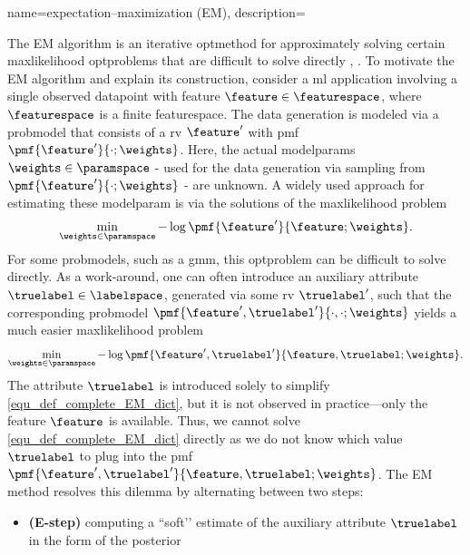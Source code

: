 {name={expectation–maximization (EM)}, 
	description={
	    The EM \gls{algorithm} is an iterative \gls{optmethod} for 
		approximately solving certain \gls{maxlikelihood} \glspl{optproblem} 
		that are difficult to solve directly \cite[Sec. 9.4]{BishopBook}, \cite[Sec. 11.4.7]{Murphy2012}.
	    To motivate the EM \gls{algorithm} and explain its construction, 
		consider a \gls{ml} application involving a single observed \gls{datapoint} 
		with \gls{feature} $\feature \in \featurespace$, where $\featurespace$ 
		is a finite \gls{featurespace}. The \gls{data} generation 
		is modeled via a \gls{probmodel} that consists of a \gls{rv} $\feature'$ 
		with \gls{pmf} $\pmf{\feature'}{\cdot;\weights}$. Here, 
		the actual \glspl{modelparam} $\weights \in \paramspace$ - used for the \gls{data} 
		generation via sampling from $\pmf{\feature'}{\cdot;\weights}$ - are unknown. A widely 
		used approach for estimating these \gls{modelparam} is via the solutions of the \gls{maxlikelihood} 
		problem
		\begin{equation}
			\label{equ_def_ML_EM_dict}
			\min_{\weights \in \paramspace} - \log \pmf{\feature'}{\feature;\weights}.
		\end{equation}
		For some \glspl{probmodel}, such as a \gls{gmm}, this \gls{optproblem} can be 
		difficult to solve directly. As a work-around, one can often introduce an auxiliary 
		attribute $\truelabel \in \labelspace$, generated via some \gls{rv} $\truelabel'$, 
		such that the corresponding \gls{probmodel} $\pmf{\feature',\truelabel'}{\cdot,\cdot;\weights}$ 
		yields a much easier \gls{maxlikelihood} problem 
		\begin{equation}
			\label{equ_def_complete_EM_dict}
			\min_{\weights \in \paramspace} 
			- \log \pmf{\feature',\truelabel'}{\feature,\truelabel;\weights}.
		\end{equation}
		The attribute $\truelabel$ is introduced solely to simplify 
		\eqref{equ_def_complete_EM_dict}, but it is not observed in practice—only the 
		feature $\feature$ is available. Thus, we cannot solve \eqref{equ_def_complete_EM_dict} 
		directly as we do not know which value $\truelabel$ to plug into the \gls{pmf} 
		$ \pmf{\feature',\truelabel'}{\feature,\truelabel;\weights}$. 
		The EM method resolves this dilemma by alternating between two steps:
		\begin{itemize}
			\item {\bf (E-step)} computing a “soft’’ estimate of the auxiliary 
			attribute $\truelabel$ in the form of the \gls{posterior} 

\end{itemize}}}
